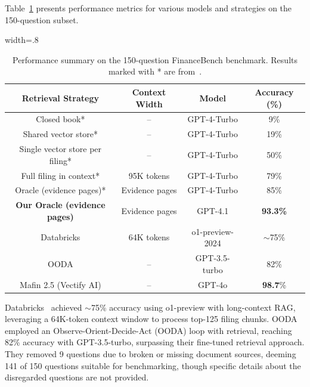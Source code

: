 \documentclass[final,5p,times,twopage,twocolumn,a4paper]{elsarticle}
\begin{document}
%
Table~\ref{tab:financebench} presents performance metrics for various models and strategies on the 150-question subset.
%
\begin{table}[!hbt]
\centering
\caption{Performance summary on the 150-question FinanceBench benchmark. Results marked with * are from~\cite{islam2023financebench}.}
\label{tab:financebench}
\begin{adjustbox}{width=.8\textwidth}
\begin{tabular}{|c|c|c|c|}
\hline
\textbf{Retrieval Strategy}          & \textbf{Context Width} & \textbf{Model}  & \textbf{Accuracy (\%)} \\ \hline
Closed book*                         & --                     & GPT-4-Turbo     & 9\%                    \\ \hline
Shared vector store*                 & --                     & GPT-4-Turbo     & 19\%                   \\ \hline
Single vector store per filing*      & --                     & GPT-4-Turbo     & 50\%                   \\ \hline
Full filing in context*              & 95K tokens             & GPT-4-Turbo     & 79\%                   \\ \hline
Oracle (evidence pages)*             & Evidence pages         & GPT-4-Turbo     & 85\%                   \\ \hline
\textbf{Our Oracle (evidence pages)} & Evidence pages         & GPT-4.1    & \textbf{93.3\%}        \\ \hline
Databricks                           & 64K tokens             & o1-preview-2024 & $\sim$75\%             \\ \hline
OODA                                 & --                     & GPT-3.5-turbo   & 82\%                   \\ \hline
Mafin 2.5 (Vectify AI)               & --                     & GPT-4o          & \textbf{98.7}\%        \\ \hline
\end{tabular}
\end{adjustbox}
\end{table}
%

Databricks~\cite{Leng2024LongCRA} achieved $\sim$75\% accuracy using o1-preview with long-context RAG, leveraging a 64K-token context window to process top-125 filing chunks. OODA~\cite{nguyen2024enhancing} employed an Observe-Orient-Decide-Act (OODA) loop with retrieval, reaching 82\% accuracy with GPT-3.5-turbo, surpassing their fine-tuned retrieval approach. They removed 9 questions due to broken or missing document sources, deeming 141 of 150 questions suitable for benchmarking, though specific details about the disregarded questions are not provided. 
\end{document}
